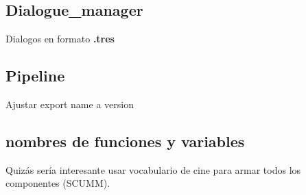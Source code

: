 \subsection{Dialogue\_manager}

Dialogos en formato \textbf{.tres}

\subsection{Pipeline}

Ajustar export name a version

\subsection{nombres de funciones y variables}

Quizás sería interesante usar vocabulario de cine para armar todos los componentes (SCUMM).

